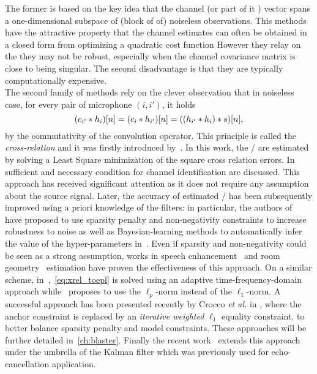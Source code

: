 The former is based on the key idea that the channel (or part of it ) vector spans a one-dimensional subspace of (block of of) noiseless observations.
This methods have the attractive property that the channel estimates can often be obtained in a closed form from optimizing a quadratic cost function
However they relay on the they may not be robust, especially when the channel covariance matrix is close to being singular.
The second disadvantage is that they are typically computationally expensive.
\\The second family of methods rely on the clever observation that in noiseless case, for every pair of microphone $(i, i')$, it holds
\begin{equation}
    (c_{i'} \ast h_i)[n] = (c_{i} \ast h_{i'})[n] =  ((h_{i'} \ast h_i) \ast s)[n]
    ,
\end{equation}
by the commutativity of the convolution operator.
This principle is called the \textit{cross-relation} and it was firstly introduced by~.
In this work, the \RIR/ are estimated by solving a Least Square minimization of the square cross relation errors.
In  sufficient and necessary condition for channel identification are discussed.
This approach has received significant attention as it does not require any assumption about the source signal.
Later, the accuracy of estimated \RIRs/ has been subsequently improved using a priori knowledge of the filters:
in particular, the authors of~ have proposed to use sparsity penalty and non-negativity constraints to increase robustness to noise as well as Bayesian-learning methods to automatically infer the value of the hyper-parameters in~.
Even if sparsity and non-negativity could be seen as a strong assumption, works in speech enhancement~ and room geometry~ estimation have proven the effectiveness of this approach.
On a similar scheme, in~,~\eqref{eq:xrel_toepl} is solved using an adaptive time-frequency-domain approach while~ proposes to use the $\ell_p$-norm instead of the $\ell_1$-norm.
A successful approach has been presented recently by Crocco \textit{et al.} in , where the anchor constraint is replaced by an \textit{iterative weighted} $\ell_1$ equality constraint.
to better balance sparsity penalty and model constraints.
These approaches will be further detailed in~\cref{ch:blaster}.
Finally the recent work~ extends this approach under the umbrella of the Kalman filter which was previously used for echo-cancellation application.

